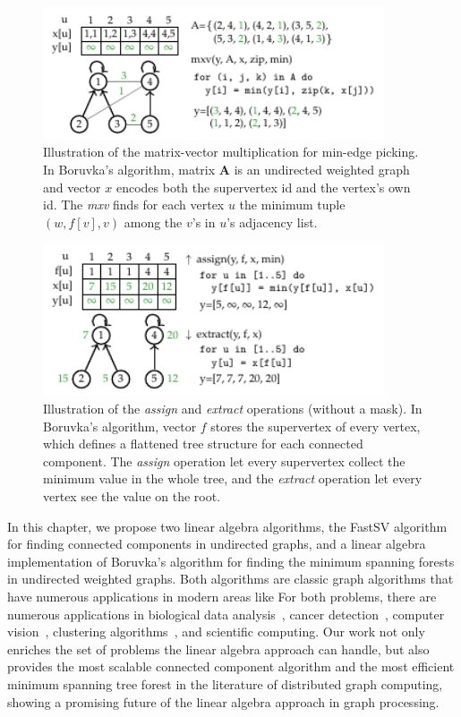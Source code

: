 \documentclass{sokendai_thesis} %
\newcommand{\boruvka}[0]{Boruvka}
\begin{document}
\begin{figure}
\includegraphics[width=0.9\textwidth]{figures/spmv-msf.pdf}
\caption{Illustration of the matrix-vector multiplication for min-edge picking. In \boruvka{}'s algorithm, matrix $\mathbf{A}$ is an undirected weighted graph and vector $x$ encodes both the supervertex id and the vertex's own id. The \emph{mxv} finds for each vertex $u$ the minimum tuple $(w, f[v], v)$ among the $v$'s in $u$'s adjacency list.}
\label{fig:spmv}
\end{figure}

\begin{figure}
\includegraphics[width=0.9\textwidth]{figures/assign.pdf}
\caption{Illustration of the \emph{assign} and \emph{extract} operations (without a mask). In \boruvka{}'s algorithm, vector $f$ stores the supervertex of every vertex, which defines a flattened tree structure for each connected component. The \emph{assign} operation let every supervertex collect the minimum value in the whole tree, and the \emph{extract} operation let every vertex see the value on the root.}
\label{fig:assign}
\end{figure}


In this chapter, we propose two linear algebra algorithms, the FastSV algorithm for finding connected components in undirected graphs, and a linear algebra implementation of \boruvka{}'s algorithm for finding the minimum spanning forests in undirected weighted graphs.
Both algorithms are classic graph algorithms that have numerous applications in modern areas like
For both problems, there are numerous applications in biological data analysis~\cite{xu2002clustering,van2000graph}, cancer detection~\cite{kayser1993minimum,brinkhuis1997minimum}, computer vision~\cite{yang1989improved}, clustering algorithms~\cite{wang2009divide,zhong2010graph}, and scientific computing.
Our work not only enriches the set of problems the linear algebra approach can handle, but also provides the most scalable connected component algorithm and the most efficient minimum spanning tree forest in the literature of distributed graph computing, showing a promising future of the linear algebra approach in graph processing.
\end{document}
